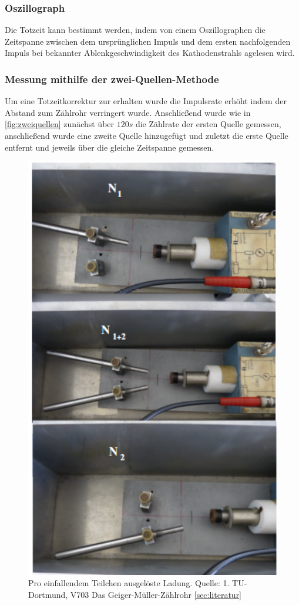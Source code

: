 \subsubsection{Oszillograph}
Die Totzeit kann bestimmt werden, indem von einem Oszillographen die Zeitspanne 
zwischen dem ursprünglichen Impuls und dem ersten nachfolgenden Impuls bei bekannter Ablenkgeschwindigkeit 
des Kathodenstrahls agelesen wird.
\subsubsection{Messung mithilfe der zwei-Quellen-Methode}
Um eine Totzeitkorrektur zur erhalten wurde die Impulsrate erhöht indem der Abstand zum Zählrohr verringert 
wurde. Anschließend wurde wie in \autoref{fig:zweiquellen} zunächst über $120s$  die Zählrate der ersten Quelle gemessen, anschließend wurde 
eine zweite Quelle hinzugefügt und zuletzt die erste Quelle entfernt und jeweils über die gleiche Zeitspanne 
gemessen.
\begin{figure}
    \centering
    \includegraphics{Zweiquellenmethode.pdf}
    \caption{Pro einfallendem Teilchen ausgelöste Ladung. Quelle: 1. TU-Dortmund, V703 Das Geiger-Müller-Zählrohr
    \autoref{sec:literatur}}
    \label{fig:zweiquellen}
  \end{figure}
